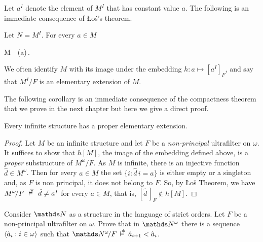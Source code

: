 \documentclass[creche.tex]{subfiles}
\begin{document}
Let \emph{$a^I$\/} denote the element of $M^I$ that has constant value $a$. The following is an immediate consequence of \L o\'{s}'s theorem.

\begin{corollary}\label{ultrapotenzeelementari}
Let $N=M^I$. For every $a\in M$

%
{\IFF}%
{M\ \models\ \phi(a)\,.}\QED
\end{corollary}

We often identify $M$ with its image under the embedding $h:a\mapsto [a^I]_F$, and say that $M^I/F$ is an elementary extension of $M$.

The following corollary is an immediate consequence of the compactness theorem that we prove in the next chapter but here we give a direct proof.

\begin{corollary}
Every infinite structure has a proper elementary extension.
\end{corollary}

\begin{proof}
Let $M$ be an infinite structure and let $F$ be a \textit{non-principal\/} ultrafilter on $\omega$.
It suffices to show that $h[M]$, the image of the embedding defined above, is a \textit{proper\/} substructure of $M^\omega\!/F$. 
As $M$ is infinite, there is an injective function  $\hat d\in M^\omega$.
Then for every $a\in M$ the set $\big\{i:\hat d\,i=a\big\}$ is either empty or a singleton and, as $F$ is non principal, it does not belong to $F$.
So, by \L o\v{s} Theorem, we have $M^\omega\!/F\ \pmodels\ \hat d\neq a^I$ for every $a\in M$, that is, $[\hat d\,]_F\notin h[M]$.
\end{proof}

\begin{exercise}
Consider $\NN$ as a structure in the language of strict orders. 
Let $F$ be a non-principal ultrafilter on $\omega$.
Prove that in $\NN^\omega$ there is a sequence $\langle\hat a_i: i\in\omega\rangle$ such that $\NN^\omega\!/F\,\pmodels\,\hat a_{i+1}<\hat a_i$.\QED 
\end{exercise}
\end{document}
